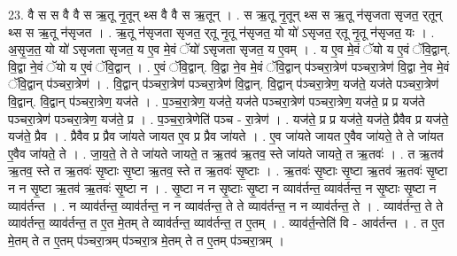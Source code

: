 \documentclass[17pt]{extarticle}
\begin{document}
23. वै स स वै वै स ऋ॒तू नृ॒तून् थ्स वै वै स ऋ॒तून् । . स ऋ॒तू नृ॒तून् थ्स स ऋ॒तू न॑सृजता सृजत॒ र्‌तून् थ्स स ऋ॒तू न॑सृजत । . ऋ॒तू न॑सृजता सृजत॒ र्‌तू नृ॒तू न॑सृजत॒ यो यो॑ ऽसृजत॒ र्‌तू नृ॒तू न॑सृजत॒ यः । . अ॒सृ॒ज॒त॒ यो यो॑ ऽसृजता सृजत॒ य ए॒व मे॒वं ॅयो॑ ऽसृजता सृजत॒ य ए॒वम् । . य ए॒व मे॒वं ॅयो य ए॒वं ॅवि॒द्वान्. वि॒द्वा ने॒वं ॅयो य ए॒वं ॅवि॒द्वान् । . ए॒वं ॅवि॒द्वान्. वि॒द्वा ने॒व मे॒वं ॅवि॒द्वान् प॑ञ्चरा॒त्रेण॑ पञ्चरा॒त्रेण॑ वि॒द्वा ने॒व मे॒वं ॅवि॒द्वान् प॑ञ्चरा॒त्रेण॑ । . वि॒द्वान् प॑ञ्चरा॒त्रेण॑ पञ्चरा॒त्रेण॑ वि॒द्वान्. वि॒द्वान् प॑ञ्चरा॒त्रेण॒ यज॑ते॒ यज॑ते पञ्चरा॒त्रेण॑ वि॒द्वान्. वि॒द्वान् प॑ञ्चरा॒त्रेण॒ यज॑ते । . प॒ञ्च॒रा॒त्रेण॒ यज॑ते॒ यज॑ते पञ्चरा॒त्रेण॑ पञ्चरा॒त्रेण॒ यज॑ते॒ प्र प्र यज॑ते पञ्चरा॒त्रेण॑ पञ्चरा॒त्रेण॒ यज॑ते॒ प्र । . प॒ञ्च॒रा॒त्रेणेति॑ पञ्च - रा॒त्रेण॑ । . यज॑ते॒ प्र प्र यज॑ते॒ यज॑ते॒ प्रैवैव प्र यज॑ते॒ यज॑ते॒ प्रैव । . प्रैवैव प्र प्रैव जा॑यते जायत ए॒व प्र प्रैव जा॑यते । . ए॒व जा॑यते जायत ए॒वैव जा॑यते॒ ते ते जा॑यत ए॒वैव जा॑यते॒ ते । . जा॒य॒ते॒ ते ते जा॑यते जायते॒ त ऋ॒तव॑ ऋ॒तव॒ स्ते जा॑यते जायते॒ त ऋ॒तवः॑ । . त ऋ॒तव॑ ऋ॒तव॒ स्ते त ऋ॒तवः॑ सृ॒ष्टाः सृ॒ष्टा ऋ॒तव॒ स्ते त ऋ॒तवः॑ सृ॒ष्टाः । . ऋ॒तवः॑ सृ॒ष्टाः सृ॒ष्टा ऋ॒तव॑ ऋ॒तवः॑ सृ॒ष्टा न न सृ॒ष्टा ऋ॒तव॑ ऋ॒तवः॑ सृ॒ष्टा न । . सृ॒ष्टा न न सृ॒ष्टाः सृ॒ष्टा न व्याव॑र्तन्त॒ व्याव॑र्तन्त॒ न सृ॒ष्टाः सृ॒ष्टा न व्याव॑र्तन्त । . न व्याव॑र्तन्त॒ व्याव॑र्तन्त॒ न न व्याव॑र्तन्त॒ ते ते व्याव॑र्तन्त॒ न न व्याव॑र्तन्त॒ ते । . व्याव॑र्तन्त॒ ते ते व्याव॑र्तन्त॒ व्याव॑र्तन्त॒ त ए॒त मे॒तम् ते व्याव॑र्तन्त॒ व्याव॑र्तन्त॒ त ए॒तम् । . व्याव॑र्त॒न्तेति॑ वि - आव॑र्तन्त । . त ए॒त मे॒तम् ते त ए॒तम् प॑ञ्चरा॒त्रम् प॑ञ्चरा॒त्र मे॒तम् ते त ए॒तम् प॑ञ्चरा॒त्रम् । \newline
\end{document}

